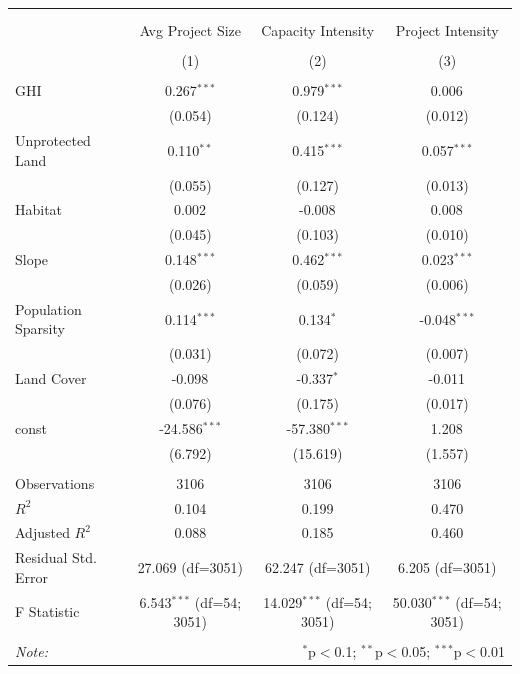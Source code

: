 \begin{table}[!htbp] \centering
\begin{tabular}{@{\extracolsep{5pt}}lccc}
\\[-1.8ex]\hline
\hline \\[-1.8ex]
\\[-1.8ex] & \multicolumn{1}{c}{Avg Project Size} & \multicolumn{1}{c}{Capacity Intensity} & \multicolumn{1}{c}{Project Intensity}  \\
\\[-1.8ex] & (1) & (2) & (3) \\
\hline \\[-1.8ex]
 GHI & 0.267$^{***}$ & 0.979$^{***}$ & 0.006$^{}$ \\
& (0.054) & (0.124) & (0.012) \\
 Unprotected Land & 0.110$^{**}$ & 0.415$^{***}$ & 0.057$^{***}$ \\
& (0.055) & (0.127) & (0.013) \\
 Habitat & 0.002$^{}$ & -0.008$^{}$ & 0.008$^{}$ \\
& (0.045) & (0.103) & (0.010) \\
 Slope & 0.148$^{***}$ & 0.462$^{***}$ & 0.023$^{***}$ \\
& (0.026) & (0.059) & (0.006) \\
 Population Sparsity & 0.114$^{***}$ & 0.134$^{*}$ & -0.048$^{***}$ \\
& (0.031) & (0.072) & (0.007) \\
 Land Cover & -0.098$^{}$ & -0.337$^{*}$ & -0.011$^{}$ \\
& (0.076) & (0.175) & (0.017) \\
 const & -24.586$^{***}$ & -57.380$^{***}$ & 1.208$^{}$ \\
& (6.792) & (15.619) & (1.557) \\
\hline \\[-1.8ex]
 Observations & 3106 & 3106 & 3106 \\
 $R^2$ & 0.104 & 0.199 & 0.470 \\
 Adjusted $R^2$ & 0.088 & 0.185 & 0.460 \\
 Residual Std. Error & 27.069 (df=3051) & 62.247 (df=3051) & 6.205 (df=3051) \\
 F Statistic & 6.543$^{***}$ (df=54; 3051) & 14.029$^{***}$ (df=54; 3051) & 50.030$^{***}$ (df=54; 3051) \\
\hline
\hline \\[-1.8ex]
\textit{Note:} & \multicolumn{3}{r}{$^{*}$p$<$0.1; $^{**}$p$<$0.05; $^{***}$p$<$0.01} \\
\end{tabular}
\end{table}